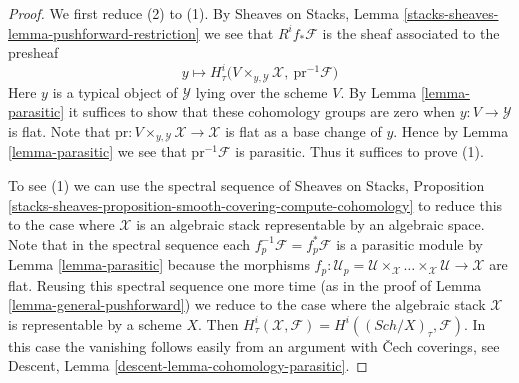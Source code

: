 \documentclass[10pt,a4paper]{amsart}
\theoremstyle{plain}
\theoremstyle{definition}
\theoremstyle{remark}
\numberwithin{equation}{subsection}
\def\Sch{\mathit{Sch}}
\begin{document}
\begin{proof}
We first reduce (2) to (1).
By Sheaves on Stacks, Lemma \ref{stacks-sheaves-lemma-pushforward-restriction}
we see that $R^if_*\mathcal{F}$ is the sheaf associated to the presheaf
$$
y \longmapsto
H^i_\tau\Big(V \times_{y, \mathcal{Y}} \mathcal{X},
\ \text{pr}^{-1}\mathcal{F}\Big)
$$
Here $y$ is a typical object of $\mathcal{Y}$ lying over the scheme $V$.
By Lemma \ref{lemma-parasitic} it suffices to show that
these cohomology groups are zero when $y : V \to \mathcal{Y}$ is flat.
Note that $\text{pr} : V \times_{y, \mathcal{Y}} \mathcal{X} \to \mathcal{X}$
is flat as a base change of $y$. Hence by
Lemma \ref{lemma-parasitic} we see that $\text{pr}^{-1}\mathcal{F}$
is parasitic. Thus it suffices to prove (1).

\medskip\noindent
To see (1) we can use the spectral sequence of
Sheaves on Stacks, Proposition
\ref{stacks-sheaves-proposition-smooth-covering-compute-cohomology}
to reduce this to the case where $\mathcal{X}$
is an algebraic stack representable by an algebraic space.
Note that in the spectral sequence each
$f_p^{-1}\mathcal{F} = f_p^*\mathcal{F}$ is a parasitic module by
Lemma \ref{lemma-parasitic} because the morphisms
$f_p : \mathcal{U}_p =
\mathcal{U} \times_\mathcal{X} \ldots
\times_\mathcal{X} \mathcal{U} \to \mathcal{X}$ are flat.
Reusing this spectral sequence one more time (as in the
proof of Lemma \ref{lemma-general-pushforward})
we reduce to the case where the
algebraic stack $\mathcal{X}$ is representable by a scheme $X$.
Then $H^i_\tau(\mathcal{X}, \mathcal{F}) = H^i((\Sch/X)_\tau, \mathcal{F})$.
In this case the vanishing follows easily from an argument
with {\v C}ech coverings, see
Descent, Lemma \ref{descent-lemma-cohomology-parasitic}.
\end{proof}
\end{document}
